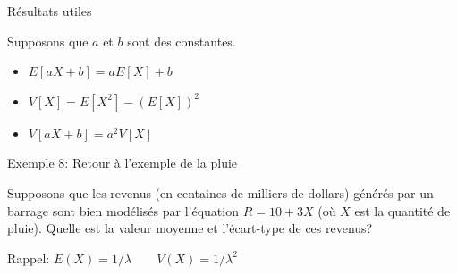 \documentclass[handout]{BeamerTemplate}
\begin{document}
\begin{frame}[t]{Résultats utiles}

Supposons que $a$ et $b$ sont des constantes.

\begin{itemize}
\item<1-> $E[aX+b]=aE[X]+b$\ \ \ \ \

\vspace{0.45in}

\item<1-> $V[X]=E[X^2]-(E[X])^2$\ \ \ \ \

\vspace{0.75in}

\item<1-> $V[aX+b]=a^2V[X]$\ \ \ \ \
\end{itemize}
\end{frame}

\begin{frame}[t]{Exemple 8: Retour à l'exemple de la pluie}

Supposons que les revenus (en centaines de milliers de dollars)
générés par un barrage sont bien modélisés par l'équation $R=10+3X$ (où $X$ est la quantité de pluie). Quelle est la valeur
moyenne et l'écart-type de ces revenus?

Rappel: $E(X)=1/\lambda\qquad V(X)=1/\lambda^2$
\end{frame}
\end{document}
